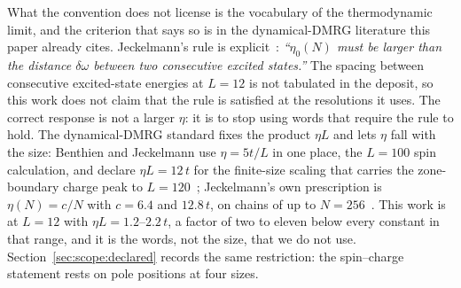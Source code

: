 What the convention does not license is the vocabulary of the thermodynamic limit, and the criterion
that says so is in the dynamical-DMRG literature this paper already cites. Jeckelmann's rule is
explicit~\cite{jeckelmann2002}: \emph{``$\eta_0(N)$ must be larger than the distance $\delta\omega$
between two consecutive excited states.''} The spacing between consecutive excited-state energies at $L=12$ is not tabulated in the
deposit, so this work does not claim that the rule is satisfied at the resolutions it uses. The correct response is not a larger $\eta$: it is to stop using words that require
the rule to hold. The dynamical-DMRG standard fixes the product $\eta L$ and lets $\eta$ fall with
the size: Benthien and Jeckelmann use $\eta=5t/L$ in one place, the $L=100$ spin calculation, and
declare $\eta L=12\,t$ for the finite-size scaling that carries the zone-boundary charge peak to
$L=120$~\cite{benthien2007}; Jeckelmann's own prescription is $\eta(N)=c/N$ with $c=6.4$ and
$12.8\,t$, on chains of up to $N=256$~\cite{jeckelmann2002}. This work is at $L=12$ with
$\eta L=1.2$--$2.2\,t$, a factor of two to eleven below every constant in that range,
and it is the words, not the size, that we do not use. Section~\ref{sec:scope:declared} records the same
restriction: the spin--charge statement rests on pole positions at four sizes.
